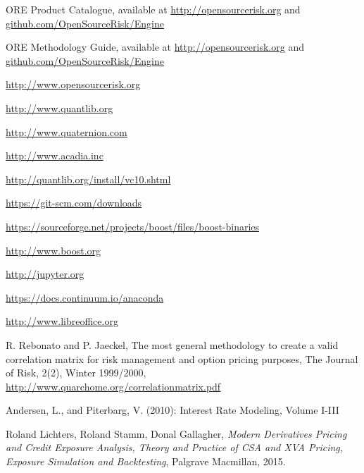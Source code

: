 \documentclass[12pt, a4paper]{article}
\begin{document}





\begin{thebibliography}{*}

 ORE Product Catalogue, available at \url{http://opensourcerisk.org} and \url{github.com/OpenSourceRisk/Engine}

 ORE Methodology Guide, available at \url{http://opensourcerisk.org} and \url{github.com/OpenSourceRisk/Engine}
  
 \url{http://www.opensourcerisk.org}

 \url{http://www.quantlib.org}
 
 \url{http://www.quaternion.com}

 \url{http://www.acadia.inc}

 \url{http://quantlib.org/install/vc10.shtml}


 \url{https://git-scm.com/downloads}

 \url{https://sourceforge.net/projects/boost/files/boost-binaries}

 \url{http://www.boost.org}

 \url{http://jupyter.org}

 \url{https://docs.continuum.io/anaconda}

 \url{http://www.libreoffice.org}


 R. Rebonato and P. Jaeckel, The most general methodology to create a valid correlation matrix for
  risk management and option pricing purposes, The Journal of Risk, 2(2), Winter 1999/2000,
  \url{http://www.quarchome.org/correlationmatrix.pdf}

 Andersen, L., and Piterbarg, V. (2010): Interest Rate Modeling, Volume I-III
  
 Roland Lichters, Roland Stamm, Donal Gallagher, {\em Modern Derivatives Pricing and Credit Exposure
    Analysis, Theory and Practice of CSA and XVA Pricing, Exposure Simulation and Backtesting}, Palgrave Macmillan,
  2015.


\end{thebibliography}
\end{document}
